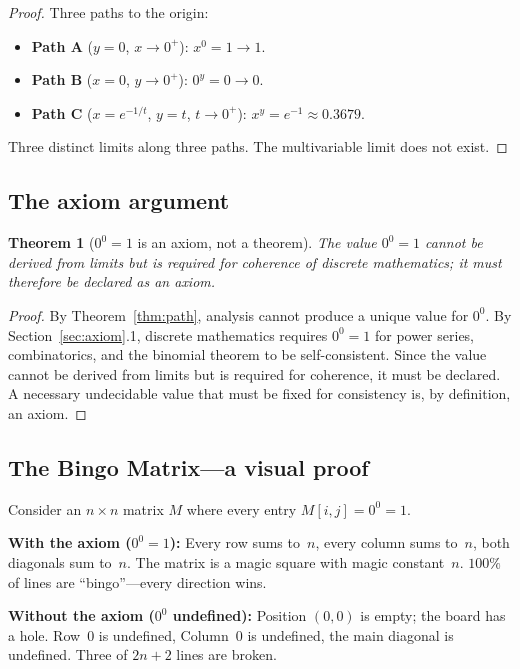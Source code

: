 \documentclass[11pt,a4paper]{article}
\newtheorem{theorem}{Theorem}[section]
\theoremstyle{definition}
\theoremstyle{remark}
\begin{document}
\begin{proof}
Three paths to the origin:
\begin{itemize}
  \item \textbf{Path A} ($y=0$, $x\to 0^{+}$): $x^{0}=1 \to 1$.
  \item \textbf{Path B} ($x=0$, $y\to 0^{+}$): $0^{y}=0 \to 0$.
  \item \textbf{Path C} ($x=e^{-1/t}$, $y=t$, $t\to 0^{+}$): $x^{y}=e^{-1}\approx 0.3679$.
\end{itemize}
Three distinct limits along three paths. The multivariable limit does not exist.
\end{proof}

\subsection{The axiom argument}

\begin{theorem}[$0^{0}=1$ is an axiom, not a theorem]\label{thm:axiom}
The value $0^{0}=1$ cannot be derived from limits but is required for coherence of discrete mathematics; it must therefore be declared as an axiom.
\end{theorem}

\begin{proof}
By Theorem~\ref{thm:path}, analysis cannot produce a unique value for $0^{0}$. By Section~\ref{sec:axiom}.1, discrete mathematics requires $0^{0}=1$ for power series, combinatorics, and the binomial theorem to be self-consistent. Since the value cannot be derived from limits but is required for coherence, it must be declared. A necessary undecidable value that must be fixed for consistency is, by definition, an axiom.
\end{proof}

\subsection{The Bingo Matrix---a visual proof}

Consider an $n \times n$ matrix $M$ where every entry $M[i,j] = 0^{0} = 1$.

\medskip
\noindent\textbf{With the axiom ($0^{0}=1$):}
Every row sums to~$n$, every column sums to~$n$, both diagonals sum to~$n$. The matrix is a magic square with magic constant~$n$. $100\%$ of lines are ``bingo''---every direction wins.

\medskip
\noindent\textbf{Without the axiom ($0^{0}$ undefined):}
Position $(0,0)$ is empty; the board has a hole. Row~$0$ is undefined, Column~$0$ is undefined, the main diagonal is undefined. Three of $2n+2$ lines are broken.
\end{document}
